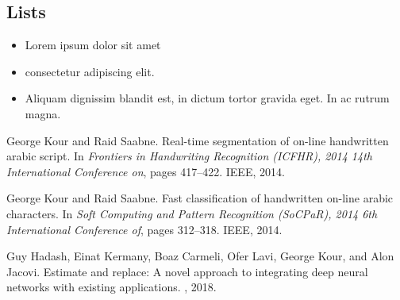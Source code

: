 \documentclass{article}
\begin{document}
\subsection{Lists}
\begin{itemize}
\item Lorem ipsum dolor sit amet
\item consectetur adipiscing elit. 
\item Aliquam dignissim blandit est, in dictum tortor gravida eget. In ac rutrum magna.
\end{itemize}

\renewcommand\refname{參考文獻}

  


\begin{thebibliography}{1}

George Kour and Raid Saabne.
\newblock Real-time segmentation of on-line handwritten arabic script.
\newblock In {\em Frontiers in Handwriting Recognition (ICFHR), 2014 14th
  International Conference on}, pages 417--422. IEEE, 2014.

George Kour and Raid Saabne.
\newblock Fast classification of handwritten on-line arabic characters.
\newblock In {\em Soft Computing and Pattern Recognition (SoCPaR), 2014 6th
  International Conference of}, pages 312--318. IEEE, 2014.

Guy Hadash, Einat Kermany, Boaz Carmeli, Ofer Lavi, George Kour, and Alon
  Jacovi.
\newblock Estimate and replace: A novel approach to integrating deep neural
  networks with existing applications.
, 2018.

\end{thebibliography}
\end{document}
